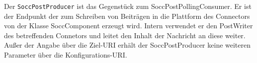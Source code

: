 Der \texttt{SoccPostProducer} ist das Gegenstück zum SoccPostPollingConsumer. Er ist der Endpunkt der zum Schreiben von Beiträgen in die Plattform des Connectors von der Klasse SoccComponent erzeugt wird. Intern verwendet er den PostWriter des betreffenden Connetors und leitet den Inhalt der Nachricht an diese weiter. Außer der Angabe über die Ziel-URI erhält der SoccPostProducer keine weiteren Parameter über die Konfigurations-URI.



